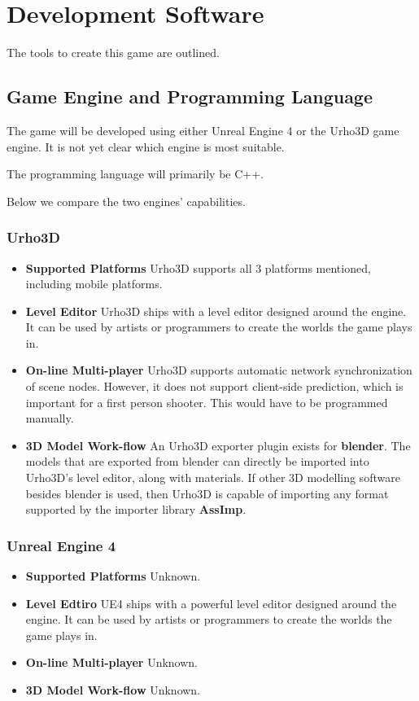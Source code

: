 \section{Development Software}

The tools to create this game are outlined.


\subsection{Game Engine and Programming Language}

The  game  will  be  developed  using either Unreal Engine 4 or the Urho3D  game
engine. It is not yet clear which engine is most suitable. 

The programming language will primarily be C++.

Below we compare the two engines' capabilities.

\subsubsection*{Urho3D}
\begin{itemize}
    \item \textbf{Supported Platforms}
        Urho3D supports all 3 platforms mentioned, including mobile platforms.
    \item \textbf{Level Editor}
        Urho3D ships with a level editor designed around  the  engine. It can be used by
        artists or programmers to create the worlds the game plays in.
    \item \textbf{On-line Multi-player}
        Urho3D  supports  automatic network synchronization of scene nodes. However,  it
        does not support  client-side  prediction, which is important for a first person
        shooter. This would have to be programmed manually.
    \item \textbf{3D Model Work-flow}
        An  Urho3D  exporter  plugin  exists  for  \textbf{blender}. The models that are
        exported from blender can directly be imported into Urho3D's level editor, along
        with materials. If other 3D modelling  software  besides  blender  is used, then
        Urho3D  is  capable  of  importing  any format supported by the importer library
        \textbf{AssImp}.
\end{itemize}


\subsubsection*{Unreal Engine 4}
\begin{itemize}
    \item \textbf{Supported Platforms}
        Unknown.
    \item \textbf{Level Edtiro}
        UE4 ships with a powerful level  editor  designed  around  the engine. It can be
        used  by  artists  or  programmers  to  create  the  worlds the game  plays  in.
    \item \textbf{On-line Multi-player}
        Unknown.
    \item \textbf{3D Model Work-flow}
        Unknown.
\end{itemize}


